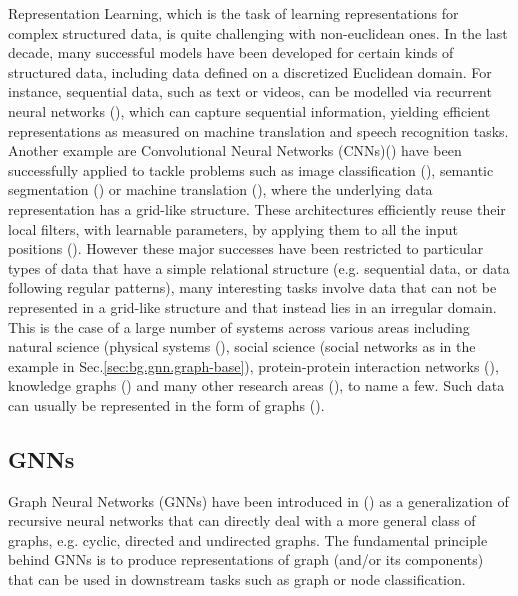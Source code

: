\documentclass[binding=0.6cm]{sapthesis}
\newcommand{\mycite}[1]{(\cite{#1})}
\begin{document}
Representation Learning, which is the task of learning representations for complex structured data, is quite challenging with non-euclidean ones. In the last decade, many successful models have been developed for certain kinds of structured data, including data defined on a discretized Euclidean domain. For instance, sequential data, such as text or videos, can be modelled via recurrent neural networks \mycite{TEAlab2018334}, which can capture sequential information, yielding efficient representations as measured on machine translation and speech recognition tasks. Another example are Convolutional Neural Networks (CNNs)\mycite{Lecun1998cnn} have been successfully applied to tackle problems such as image classification (\cite{venkatesan2017convolutional}), semantic segmentation (\cite{jégou2017layers}) or machine translation (\cite{gehring2017convolutional}), where the underlying data representation has a grid-like structure. These architectures efficiently reuse their local filters, with learnable parameters, by applying them to all the input positions \mycite{LeCun2015DeepL}. However these major successes have been restricted to particular types of data that have a simple relational structure (e.g. sequential data, or data following regular patterns), many interesting tasks involve data that can not be represented in a grid-like structure and that instead lies in an irregular domain. This is the case of a large number of systems across various areas including natural science (physical systems (\cite{pmlr-v80-sanchez-gonzalez18a}), social science (social networks as in the example in Sec.\ref{sec:bg.gnn.graph-base}), protein-protein interaction networks (\cite{nips2017_PPI}), knowledge graphs (\cite{ijcai2017p250}) and many other research areas (\cite{nips2017_combOpt}), to name a few. Such data can usually be represented in the form of graphs \mycite{veličković2018gat}.


\subsection{GNNs}
\label{sec:bg.gnn.gnns}
Graph Neural Networks (GNNs) have been introduced in \mycite{Gori2005graphDomain,gnnModel2009} as a generalization of recursive neural networks that can directly deal with a more general class of graphs, e.g. cyclic, directed and undirected graphs. The fundamental principle behind GNNs is to produce representations of graph (and/or its components) that can be used in downstream tasks such as graph or node classification.
\end{document}
